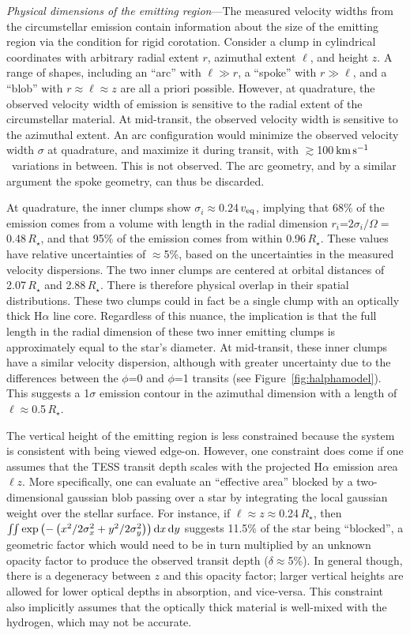\documentclass[11pt,twocolumn,tighten,linenumbers]{aastex7}
\newcommand{\kms}{\ensuremath{\rm km\,s^{-1}}}
\begin{document}
{\it Physical dimensions of the emitting region}---The measured
velocity widths from the circumstellar emission contain information
about the size of the emitting region via the condition for rigid
corotation.  Consider a clump in cylindrical coordinates with
arbitrary radial extent $r$, azimuthal extent $\ell$, and height $z$.
A range of shapes, including an ``arc'' with $\ell \gg r$, a ``spoke''
with $r \gg \ell$, and a ``blob'' with $r \approx \ell \approx z$ are
all a priori possible.  However, at quadrature, the observed velocity
width of emission is sensitive to the radial extent of the
circumstellar material.  At mid-transit, the observed velocity width
is sensitive to the azimuthal extent.  An arc configuration would
minimize the observed velocity width $\sigma$ at quadrature, and
maximize it during transit, with $\gtrsim$100\,\kms\ variations in
between.  This is not observed.   The arc geometry, and by a similar
argument the spoke geometry, can thus be discarded.  

At quadrature, the inner clumps show $\sigma_i$$\approx$0.24\,$v_{\rm
eq}$, implying that 68\% of the emission comes from a volume with
length in the radial dimension $r_i$=$2\sigma_i /
\Omega$$=$0.48\,$R_\star$, and that 95\% of the emission comes from
within 0.96\,$R_\star$.  These values have relative uncertainties of
$\approx$5\%, based on the uncertainties in the measured velocity
dispersions.  The two inner clumps are centered at orbital distances
of 2.07\,$R_\star$ and 2.88\,$R_\star$.  There is therefore physical
overlap in their spatial distributions.  These two clumps could in
fact be a single clump with an optically thick H$\alpha$ line core.
Regardless of this nuance, the implication is that the full length in
the radial dimension of these two inner emitting clumps is
approximately equal to the star's diameter.  At mid-transit, these
inner clumps have a similar velocity dispersion, although with
greater uncertainty due to the differences between the $\phi$=0 and
$\phi$=1 transits (see Figure~\ref{fig:halphamodel}).
This suggests a 1$\sigma$ emission contour in the azimuthal dimension
with a length of $\ell$$\approx$0.5\,$R_\star$.

The vertical height of the emitting region is less constrained because
the system is consistent with being viewed edge-on.  However, one
constraint does come if one assumes that the TESS transit depth scales
with the projected H$\alpha$ emission area $\ell z$.  
More specifically, one can evaluate an ``effective area'' blocked by a
two-dimensional gaussian blob passing over a star by integrating the
local gaussian weight over the stellar surface.  For instance, if
$\ell$$\approx$$z$$\approx$0.24\,$R_\star$, then
$\iint \exp \left(
  -\left( x^2/2\sigma_x^2 + y^2/2\sigma_y^2 \right)
\right) {\rm d}x \, {\rm d}y$
suggests 11.5\% of the star being ``blocked'', a geometric factor
which would need to be in turn multiplied by an unknown opacity factor
to produce the observed transit depth ($\delta$$\approx$5\%).  In
general though, there is a degeneracy between $z$ and this opacity
factor; larger vertical heights are allowed for lower optical depths
in absorption, and vice-versa.  This constraint also implicitly
assumes that the optically thick material is well-mixed with the
hydrogen, which may not be accurate.
\end{document}

